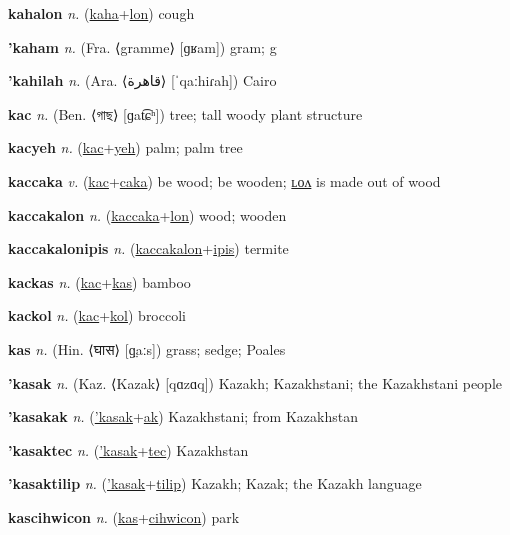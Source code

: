 \textbf{\hypertarget{kahalon}{kahalon}} \textit{n.} (\hyperlink{kaha}{kaha}+\allowbreak \hyperlink{lon}{lon})
cough

\textbf{\hypertarget{'kaham}{'kaham}} \textit{n.} (Fra. ⟨gramme⟩ [ɡʁam])
gram; g

\textbf{\hypertarget{'kahilah}{'kahilah}} \textit{n.} (Ara. ⟨{\arabics{}قاهرة}⟩ [ˈqaːhiɾah])
Cairo

\textbf{\hypertarget{kac}{kac}} \textit{n.} (Ben. ⟨{\bengali{}গাছ}⟩ [ɡat͡ɕʰ])
tree; tall woody plant structure

\textbf{\hypertarget{kacyeh}{kacyeh}} \textit{n.} (\hyperlink{kac}{kac}+\allowbreak \hyperlink{yeh}{yeh})
palm; palm tree

\textbf{\hypertarget{kaccaka}{kaccaka}} \textit{v.} (\hyperlink{kac}{kac}+\allowbreak \hyperlink{caka}{caka})
be wood; be wooden; \hyperlink{kaccakalon}{ʟᴏᴧ} is made out of wood

\textbf{\hypertarget{kaccakalon}{kaccakalon}} \textit{n.} (\hyperlink{kaccaka}{kaccaka}+\allowbreak \hyperlink{lon}{lon})
wood; wooden

\textbf{\hypertarget{kaccakalonipis}{kaccakalonipis}} \textit{n.} (\hyperlink{kaccakalon}{kaccakalon}+\allowbreak \hyperlink{ipis}{ipis})
termite

\textbf{\hypertarget{kackas}{kackas}} \textit{n.} (\hyperlink{kac}{kac}+\allowbreak \hyperlink{kas}{kas})
bamboo

\textbf{\hypertarget{kackol}{kackol}} \textit{n.} (\hyperlink{kac}{kac}+\allowbreak \hyperlink{kol}{kol})
broccoli

\textbf{\hypertarget{kas}{kas}} \textit{n.} (Hin. ⟨{\devanagari{}घास}⟩ [ɡ̤aːs])
grass; sedge; Poales

\textbf{\hypertarget{'kasak}{'kasak}} \textit{n.} (Kaz. ⟨Kazak⟩ [qɑzɑq])
Kazakh; Kazakhstani; the Kazakhstani people

\textbf{\hypertarget{'kasakak}{'kasakak}} \textit{n.} (\hyperlink{'kasak}{'kasak}+\allowbreak \hyperlink{ak}{ak})
Kazakhstani; from Kazakhstan

\textbf{\hypertarget{'kasaktec}{'kasaktec}} \textit{n.} (\hyperlink{'kasak}{'kasak}+\allowbreak \hyperlink{tec}{tec})
Kazakhstan

\textbf{\hypertarget{'kasaktilip}{'kasaktilip}} \textit{n.} (\hyperlink{'kasak}{'kasak}+\allowbreak \hyperlink{tilip}{tilip})
Kazakh; Kazak; the Kazakh language

\textbf{\hypertarget{kascihwicon}{kascihwicon}} \textit{n.} (\hyperlink{kas}{kas}+\allowbreak \hyperlink{cihwicon}{cihwicon})
park

